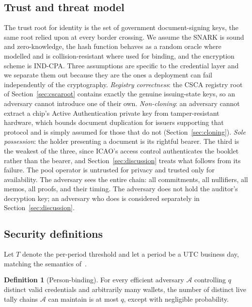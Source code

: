 \documentclass[11pt,a4paper]{article}
\theoremstyle{definition}
\newtheorem{definition}{Definition}
\theoremstyle{plain}
\theoremstyle{remark}
\newcommand{\adv}{\ensuremath{\mathcal{A}}}
\begin{document}
\subsection{Trust and threat model}

The trust root for identity is the set of government document-signing keys, the same root relied upon at every border crossing. We assume the SNARK is sound and zero-knowledge, the hash function behaves as a random oracle where modelled and is collision-resistant where used for binding, and the encryption scheme is IND-CPA. Three assumptions are specific to the credential layer and we separate them out because they are the ones a deployment can fail independently of the cryptography. \emph{Registry correctness}: the CSCA registry root of Section~\ref{sec:cscaroot} contains exactly the genuine issuing-state keys, so an adversary cannot introduce one of their own. \emph{Non-cloning}: an adversary cannot extract a chip's Active Authentication private key from tamper-resistant hardware, which bounds document duplication for issuers supporting that protocol and is simply assumed for those that do not (Section~\ref{sec:cloning}). \emph{Sole possession}: the holder presenting a document is its rightful bearer. The third is the weakest of the three, since ICAO's access control authenticates the booklet rather than the bearer, and Section~\ref{sec:discussion} treats what follows from its failure. The pool operator is untrusted for privacy and trusted only for availability. The adversary sees the entire chain: all commitments, all nullifiers, all memos, all proofs, and their timing. The adversary does not hold the auditor's decryption key; an adversary who does is considered separately in Section~\ref{sec:discussion}.

\subsection{Security definitions}

Let $T$ denote the per-period threshold and let a period be a UTC business day, matching the semantics of~\cite{cfr1010313}.

\begin{definition}[Person-binding]
For every efficient adversary $\adv$ controlling $q$ distinct valid credentials and arbitrarily many wallets, the number of distinct live tally chains $\adv$ can maintain is at most $q$, except with negligible probability.
\end{definition}
\end{document}
